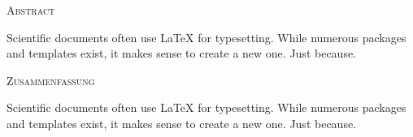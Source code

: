 \begin{center}
    \textsc{Abstract}
  \end{center}
  \noindent
  Scientific documents often use \LaTeX{} for typesetting. While numerous
  packages and templates exist, it makes sense to create a new one. Just
  because.


\begin{center}
    \textsc{Zusammenfassung}
  \end{center}

  \noindent
  Scientific documents often use \LaTeX{} for typesetting. While numerous
  packages and templates exist, it makes sense to create a new one. Just
  because.
